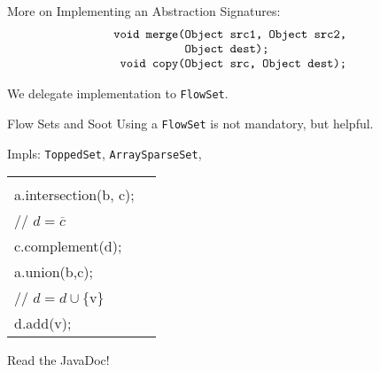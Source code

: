 \begin{slide}{More on Implementing an Abstraction}
Signatures:
{\small 
\[ \mbox{\tt \begin{tabular}{r@{}l}
                 void merge(&Object src1, Object src2,\\
                            &Object dest);\\
                 void copy(&Object src, Object dest);
\end{tabular}}\]
}

We delegate implementation to {\tt FlowSet}.
\end{slide}

\begin{slide}{Flow Sets and Soot}
\vspace*{-0.1in}
Using a {\tt FlowSet} is not mandatory, but helpful.

\quad

Impls: {\tt ToppedSet}, {\tt ArraySparseSet}, \\
\qquad {}

\quad

\begin{tabular}{ll}
\begin{minipage}{0.5\textwidth}
{\small \tt 
// $c = a \cap b$ \\
a.intersection(b, c); \\

// $d = \overline{c}$\\
c.complement(d);
}
\end{minipage} &
\begin{minipage}{0.3\textwidth}
{\small \tt
// $c = a \cup b$ \\
a.union(b,c);\\

// $d = d \cup \{ \mbox{v} \}$\\
d.add(v);
}
\end{minipage}

\end{tabular}

\quad

\begin{center}
Read the JavaDoc!
\end{center}
\end{slide}

